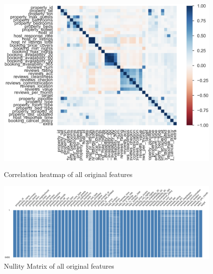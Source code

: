 \documentclass[11pt, oneside]{article}   	%
\begin{document}
\begin{figure}[t!]
\centering
	\centering
	\includegraphics[width=1\linewidth]{Assignment1CorrInit}
\caption{Correlation heatmap of all original features}
\label{figure label}

	\centering
	\includegraphics[width=1\linewidth]{NullityMatrix}
\caption{Nullity Matrix of all original features}
\label{figure label}
\end{figure}

\clearpage
\end{document}
